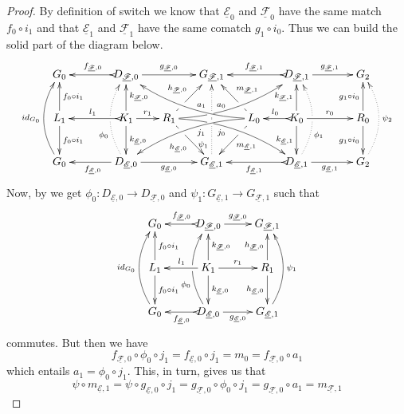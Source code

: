 \documentclass[a4paper,UKenglish,cleveref,pdftex, thm-restate,numberwithinsect]{lipics}
\newcommand{\id}[1]{\mathsf{id}_{#1}}
\newcommand{\dder}[1]{\mathscr{#1}}
\newcommand{\der}[1]{\underline{\dder{#1}}}
\begin{document}
\begin{proof}
	By definition of switch we know that $\der{E}_0$ and $\der{F}_0$ have the same match $f_0\circ i_1$ and that $\der{E}_1$ and $\der{F}_1$ have the same comatch $g_1\circ i_0$. Thus we can build the solid part of the diagram below.
	\[\xymatrix@C=15pt{G_{0} && \ar@{>->}[ll]_{f_{\der{F},0}} D_{\der{F},0} \ar[rr]^{g_{\der{F},0}}&& G_{\der{F},1} && \ar@{>->}[ll]_{f_{\der{F},1}} D_{\der{F},1} \ar[rr]^{g_{\der{F},1}}&& G_{2}\\L_1 \ar[d]^{f_0\circ i_1} \ar[u]_{f_0\circ i_1}&& K_{1} \ar[d]^{k_{\der{E},0}} \ar[u]_{k_{\der{F},0}}\ar@{>->}[ll]_{l_1} \ar[r]^{r_1} & R_{1} \ar@/^.35cm/[drrr]|(.3)\hole_(.4){j_0} \ar[dr]|(.3)\hole_{h_{\der{E},0}} \ar@/_.35cm/[urrr]|(.3)\hole^(.4){a_0} \ar[ur]|(.3)\hole^{h_{\der{F},0}}& &L_{0} \ar@/_.35cm/[dlll]^(.4){j_1} \ar[dl]|(.3)\hole^{m_{\der{E},1}} \ar@/^.35cm/[ulll]_(.4){a_1} \ar[ul]|(.3)\hole_{m_{\der{F},1}}& K_{0} \ar[d]_{k_{\der{E},1}} \ar[u]^{k_{\der{F},1}}\ar@{>->}[l]_{l_{0}} \ar[rr]^{r_0} && R_{0} \ar[d]_{g_1\circ i_0} \ar[u]^{g_1\circ i_0}\\ \ar@/^.5cm/[uu]^{\id{G_0}} G_{0} && \ar[ll]^{f_{\der{E},0}} D_{\der{E},0} \ar@{.>}@/^.5cm/[uu]^(.33){\phi_{0}}|\hole \ar[rr]_{g_{\der{E},0}}&& G_{\der{E},1} \ar@{.>}[uu]^(.2){\psi_1}|(.45)\hole |(.55)\hole&& \ar@{>->}[ll]^{f_{\der{E},1}} D_{\der{E},1} \ar@{.>}@/_.5cm/[uu]_(.33){\phi_{1}}|\hole\ar[rr]_{g_{\der{E},1}}&& G_{2}\ar@{.>}@/_.5cm/[uu]_{\psi_2}}\]
	Now, by  we get $\phi_0\colon D_{\der{E},0}\to D_{\der{F},0}$ and $\psi_1 \colon G_{\der{E},1}\to G_{\der{F},1}$ such that 
	\[\xymatrix{G_{0} & \ar@{>->}[l]_{f_{\der{F},0}} D_{\der{F},0} \ar[r]^{g_{\der{F},0}}& G_{\der{F},1} \\L_1 \ar[d]^{f_0\circ i_1} \ar[u]_{f_0\circ i_1}& K_{1} \ar[d]^{k_{\der{E},0}} \ar[u]_{k_{\der{F},0}}\ar[l]_{l_1} \ar[r]^{r_1} & R_{1}  \ar[d]_{h_{\der{E},0}}  \ar[u]^{h_{\der{F},0}}\\ \ar@/^.5cm/[uu]^{\id{G_0}} G_{0} & \ar@{>->}[l]^{f_{\der{E},0}} D_{\der{E},0} \ar@/^.5cm/[uu]^(.33){\phi_{0}}|\hole \ar[r]_{g_{\der{E},0}}& G_{\der{E},1} \ar@/_.5cm/[uu]_{\psi_1}}\]
	commutes. But then we have
	\[
	f_{\der{F},0}\circ \phi_0\circ j_1=f_{\der{E},0} \circ j_1=m_0=f_{\der{F},0}\circ a_1\]
	which entails $a_1= \phi_0\circ j_1$. This, in turn, gives us that
	\[\psi\circ m_{\der{E},1}=\psi \circ g_{\der{E},0}\circ j_1=g_{\der{F},0}\circ \phi_0\circ j_1=g_{\der{F},0}\circ a_1=m_{\der{F},1}\]
	

\end{proof}
\end{document}
